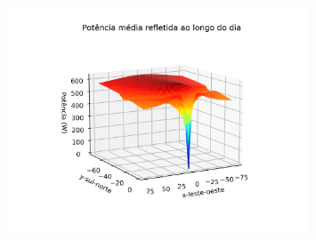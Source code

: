 \documentclass[12pt,notheorems,hyperref={pdfauthor=Professor Rafael Nardi}]{beamer}
\begin{document}
\begin{frame}%
	\begin{figure}[htpb]
		\centering
		\includegraphics[width=0.8\textwidth]{../../plots/tower_shadow_correction/square_grid_along_day.png}
		\label{fig:heliost_field_average}
	\end{figure}
\end{frame}
\end{document}
